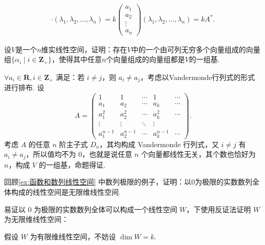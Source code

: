 \begin{exercise}
\begin{exgroup}
\begin{answer}
\begin{align*}
                \cdot (\lambda_1, \lambda_2, \ldots, \lambda_n) = k
                \begin{pmatrix} a_1 \\ a_2 \\ \vdots \\ a_n \end{pmatrix}
                (\lambda_1, \lambda_2, \ldots, \lambda_n) = kA^*.
            \end{align*}
        \end{answer}

        \item 设$V$是一个$n$维实线性空间，证明：存在$V$中的一个由可列无穷多个向量组成的向量组$\{\alpha_i \mid i\in\mathbf{Z}_+\}$，使得其中任意$n$个向量组成的向量组都是$V$的一组基.
        \begin{answer}
            $\forall a_i \in \mathbf{R}, i \in \mathbf{Z}_{+}$ 满足：若 $i \neq j$，则 $a_i \neq a_j$，考虑以Vandermonde行列式的形式进行排布. 设
            \[ A = \begin{pmatrix}
                    1         & 1         & \cdots & 1         & \cdots \\
                    a_1       & a_2       & \cdots & a_k       & \cdots \\
                    a_1^2     & a_2^2     & \cdots & a_k^2     & \cdots \\
                    \vdots    & \vdots    & \ddots & \vdots    &        \\
                    a_1^{n-1} & a_2^{n-1} & \cdots & a_k^{n-1} & \cdots
                \end{pmatrix}.\]
            考虑 $A$ 的任意 $n$ 阶主子式 $D_n$，其均构成 Vandermonde 行列式，又 $i \neq j$ 有 $a_i \neq a_j$，所以值均不为 0，也就是说任意 $n$ 个向量都线性无关，其个数也恰好为 $n$，构成 $V$ 的一组基，命题得证.
        \end{answer}

        \item 回顾\autoref{ex:函数和数列线性空间} 中数列极限的例子，证明：以$0$为极限的实数数列全体构成的线性空间是无限维线性空间.
        \begin{answer}
            易证以 $0$ 为极限的实数数列全体可以构成一个线性空间 $W$，下使用反证法证明 $W$ 为无限维线性空间：

            假设 $W$ 为有限维线性空间，不妨设 $\dim W = k$.


\end{answer}
\end{exgroup}
\end{exercise}
